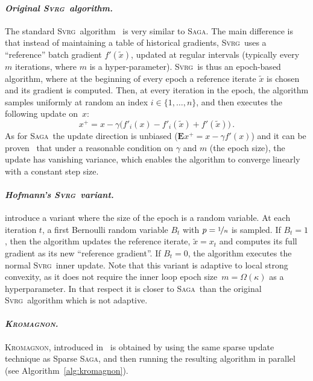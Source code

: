 \documentclass[twoside, 11pt]{article}
\newcommand{\stepsize}{\gamma}
\newcommand{\Econd}{\mathbf{E}}
\newcommand{\SAGA}{\textsc{Saga}}
\newcommand{\SVRG}{\textsc{Svrg}}
\newcommand{\KROMAGNON}{\textsc{Kromagnon}}
\begin{document}
\paragraph{\textit{Original \SVRG\ algorithm.}}
The standard \SVRG\ algorithm~\citep{svrg} is very similar to \SAGA.
The main difference is that instead of maintaining a table of historical gradients, \SVRG\ uses a ``reference'' batch gradient $f'(\tilde{x})$, updated at regular intervals (typically every $m$ iterations, where $m$ is a hyper-parameter).
\SVRG\ is thus an epoch-based algorithm, where at the beginning of every epoch a reference iterate $\tilde{x}$ is chosen and its gradient is computed.
Then, at every iteration in the epoch, the algorithm samples uniformly at random an index $i \in \{1,\ldots, n\}$, and then executes the following update on~$x$:
\begin{equation}\label{eq:SVRGAupdate}
x^{+} = x - \stepsize \big(f'_i(x) - f'_i(\tilde x) + f'(\tilde x)\big) \,.
\end{equation}
As for \SAGA\ the update direction is unbiased ($\Econd x^{+} = x - \stepsize f'(x)$) and it can be proven~\citep[see][]{svrg} that under a reasonable condition on $\stepsize$ and $m$ (the epoch size), the update has vanishing variance, which enables the algorithm to converge linearly with a constant step size.

\paragraph{\textit{Hofmann's \SVRG\ variant.}}
\citet{qsaga} introduce a variant where the size of the epoch is a random variable.
At each iteration $t$, a first Bernoulli random variable $B_t$ with $p = \nicefrac{1}{n}$ is sampled.
If $B_t = 1$, then the algorithm updates the reference iterate, $\tilde{x} = x_t$ and computes its full gradient as its new ``reference gradient''.
If $B_t = 0$, the algorithm executes the normal \SVRG\ inner update.
Note that this variant is adaptive to local strong convexity, as it does not require the inner loop epoch size~$m = \Omega(\kappa)$ as a hyperparameter.
In that respect it is closer to \SAGA\ than the original \SVRG\ algorithm which is not adaptive.

\paragraph{\textit{\KROMAGNON.}}
\KROMAGNON, introduced in~\citet{mania} is obtained by using the same sparse update technique as Sparse \SAGA, and then running the resulting algorithm in parallel (see Algorithm~\ref{alg:kromagnon}).
\end{document}
